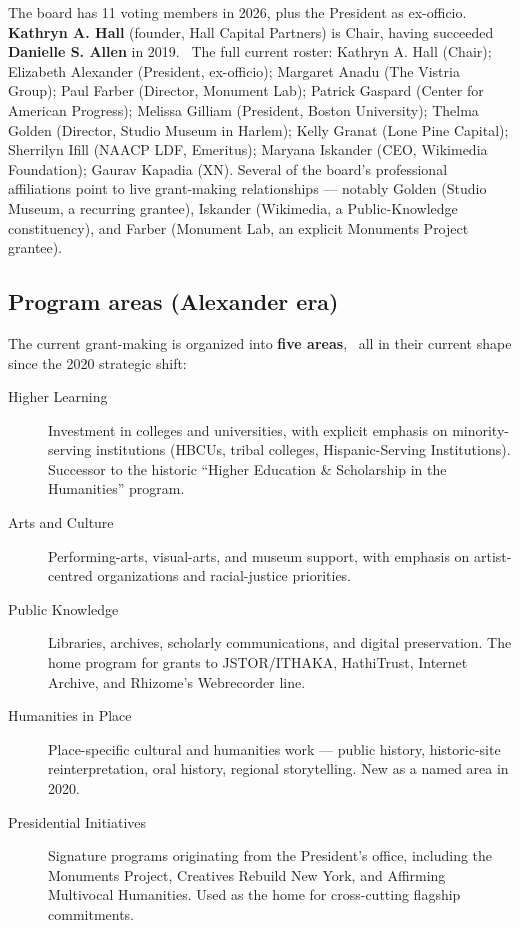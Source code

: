 \documentclass[10pt,letterpaper,twocolumn]{article}
\begin{document}
The board has 11 voting members in 2026, plus the President as ex-officio.~\citep{mellontrustees} \textbf{Kathryn A. Hall} (founder, Hall Capital Partners) is Chair, having succeeded \textbf{Danielle S. Allen} in 2019.~\citep{mellontrustees,mellonprnewswire2019} The full current roster: Kathryn A. Hall (Chair); Elizabeth Alexander (President, ex-officio); Margaret Anadu (The Vistria Group); Paul Farber (Director, Monument Lab); Patrick Gaspard (Center for American Progress); Melissa Gilliam (President, Boston University); Thelma Golden (Director, Studio Museum in Harlem); Kelly Granat (Lone Pine Capital); Sherrilyn Ifill (NAACP LDF, Emeritus); Maryana Iskander (CEO, Wikimedia Foundation); Gaurav Kapadia (XN). Several of the board's professional affiliations point to live grant-making relationships --- notably Golden (Studio Museum, a recurring grantee), Iskander (Wikimedia, a Public-Knowledge constituency), and Farber (Monument Lab, an explicit Monuments Project grantee).

\subsection{Program areas (Alexander era)}

The current grant-making is organized into \textbf{five areas},~\citep{mellonprograms,mellongrantprograms} all in their current shape since the 2020 strategic shift:

\begin{description}
\item[Higher Learning] Investment in colleges and universities, with explicit emphasis on minority-serving institutions (HBCUs, tribal colleges, Hispanic-Serving Institutions). Successor to the historic ``Higher Education \& Scholarship in the Humanities'' program.
\item[Arts and Culture] Performing-arts, visual-arts, and museum support, with emphasis on artist-centred organizations and racial-justice priorities.
\item[Public Knowledge] Libraries, archives, scholarly communications, and digital preservation. The home program for grants to JSTOR/ITHAKA, HathiTrust, Internet Archive, and Rhizome's Webrecorder line.
\item[Humanities in Place] Place-specific cultural and humanities work --- public history, historic-site reinterpretation, oral history, regional storytelling. New as a named area in 2020.
\item[Presidential Initiatives] Signature programs originating from the President's office, including the Monuments Project, Creatives Rebuild New York, and Affirming Multivocal Humanities. Used as the home for cross-cutting flagship commitments.
\end{description}
\end{document}
